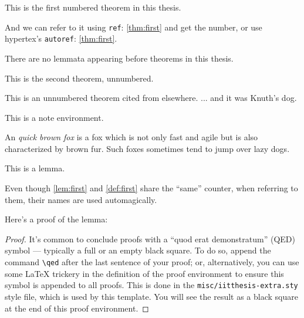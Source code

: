 \begin{theorem}
\label{thm:first}
This is the first numbered theorem in this thesis.
\end{theorem}

And we can refer to it using \texttt{ref}: \ref{thm:first} and get the number, or use hypertex's \texttt{autoref}: \autoref{thm:first}.

\begin{corollary}
\label{cor:first}
There are no lemmata appearing before theorems in this thesis.
\end{corollary}

\begin{theorem*}
This is the second theorem, unnumbered.
\end{theorem*}

\begin{theorem*}
This is an unnumbered theorem cited from elsewhere.  ... and it was Knuth's dog.
\end{theorem*}

\begin{note}
This is a note environment.  
\end{note}

\begin{definition}
\label{def:first}
An \emph{quick brown fox} is a fox which is not only fast and agile but is also characterized by brown fur. Such foxes sometimes tend to jump over lazy dogs.
\end{definition}

\begin{lemma}
\label{lem:first}
This is a lemma. 
\end{lemma}

Even though \autoref{lem:first} and \autoref{def:first} share the ``same'' counter, when referring to them, their names are used automagically.

Here's a proof of the lemma:
\begin{proof}%
\lipsum[2]
	It's common to conclude proofs with a ``quod erat demonstratum'' (QED) symbol --- typically a full or an empty black square. To do so, append the command \verb|\qed| after the last sentence of your proof; or, alternatively, you can use some \LaTeX{} trickery in the definition of the proof environment to ensure this symbol is appended to all proofs. This is done in the \texttt{misc/iitthesis-extra.sty} style file, which is used by this template. You will see the result as a black square at the end of this proof environment.
\end{proof}

